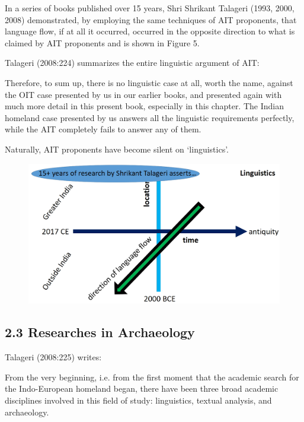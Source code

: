 In a series of books published over 15 years, Shri Shrikant Talageri (1993, 2000, 2008) demonstrated, by employing the same techniques of AIT proponents, that language flow, if at all it occurred, occurred in the opposite direction to what is claimed by AIT proponents and is shown in Figure 5.

Talageri (2008:224) summarizes the entire linguistic argument of AIT:

\begin{myquote}
Therefore, to sum up, there is no linguistic case at all, worth the name, against the OIT case presented by us in our earlier books, and presented again with much more detail in this present book, especially in this chapter. The Indian homeland case presented by us answers all the linguistic requirements perfectly, while the AIT completely fails to answer any of them.
\end{myquote}

Naturally, AIT proponents have become silent on ‘linguistics’.

\begin{figure}[!htbp]
\includegraphics[scale=0.15]{"images/8-05.jpg"}
\caption{}\label{art8-fig05}
\end{figure}


\subsection*{2.3 Researches in Archaeology}

Talageri (2008:225) writes:

\begin{myquote}
From the very beginning, i.e. from the first moment that the academic search for the Indo-European homeland began, there have been three broad academic disciplines involved in this field of study: linguistics, textual analysis, and archaeology.
\end{myquote}

